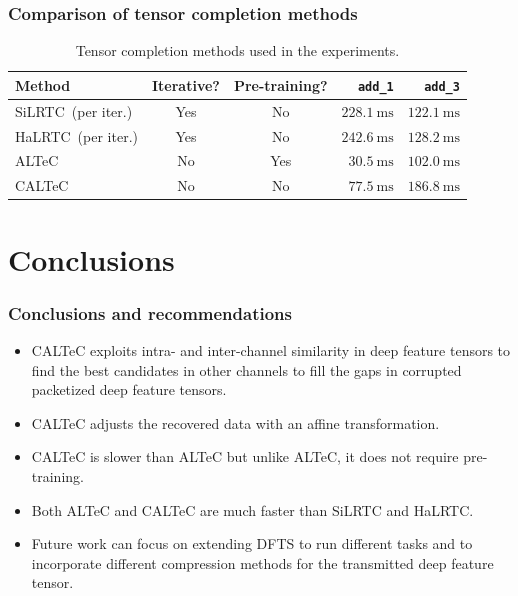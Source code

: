 \documentclass[aspectratio=169]{beamer}
\begin{document}
\begin{frame}
    \frametitle{Comparison of tensor completion methods}
    \begin{table}[b]
\caption{Tensor completion methods used in the experiments.}
\vspace{4pt}
    \label{tab:methods}
    \centering
    \begin{tabular}{l|c|c|r|r}
         Method & Iterative? & Pre-training? & \texttt{add\_1} & \texttt{add\_3} \\
         \hline
         SiLRTC~\cite{liu2012tensor}(per iter.)& Yes & No & $228.1~\mathrm{ms}$ & $122.1~\mathrm{ms}$ \\
         HaLRTC~\cite{liu2012tensor}(per iter.) & Yes & No & $242.6~\mathrm{ms}$ & $128.2~\mathrm{ms}$ \\
         ALTeC~\cite{Bragile2020} & No & Yes & $30.5~\mathrm{ms}$ & $102.0~\mathrm{ms}$ \\
         CALTeC & No & No & $77.5~\mathrm{ms}$ & $186.8~\mathrm{ms}$
    \end{tabular}
\end{table}
\end{frame}

\section{Conclusions}
\begin{frame}
	\frametitle{Conclusions and recommendations}
	\begin{itemize}
		\item CALTeC exploits intra- and inter-channel similarity in deep feature tensors to find the best candidates in other channels to fill the gaps in corrupted packetized deep feature tensors.
		\item CALTeC adjusts the recovered data with an affine transformation.
		\item CALTeC is slower than ALTeC but unlike ALTeC, it does not require pre-training.
		\item Both ALTeC and CALTeC are much faster than SiLRTC and HaLRTC.
		\item Future work can focus on extending DFTS to run different tasks and to incorporate different compression methods for the transmitted deep feature tensor.
	\end{itemize}
\end{frame}

\end{document}

